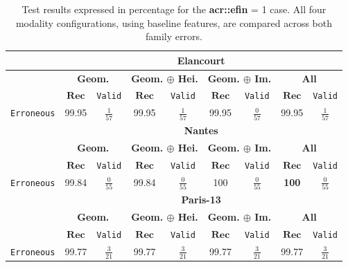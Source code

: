         \begin{table}
            \footnotesize
            \renewcommand{\arraystretch}{1.5}
            \begin{tabular}{|c | c c | c c | c c | c c |}
                \hline
                & \multicolumn{8}{c|}{\textbf{Elancourt}}\\
                \hline
                &\multicolumn{2}{c|}{\textbf{Geom.}} & \multicolumn{2}{c|}{\textbf{Geom. \(\oplus\) Hei.}} & \multicolumn{2}{c|}{\textbf{Geom. \(\oplus\) Im.}} & \multicolumn{2}{x{2.4cm}|}{\textbf{All}}\\
                \cline{2-9}
                & \(\bm{Rec}\) & \texttt{Valid} &  \(\bm{Rec}\) & \texttt{Valid} &  \(\bm{Rec}\) & \texttt{Valid} &  \(\bm{Rec}\) & \texttt{Valid} \\
                \hline
                \texttt{Erroneous} & 99.95 & $\frac{1}{57}$ & 99.95 & $\frac{1}{57}$ & 99.95 & $\frac{0}{57}$ & 99.95 & $\frac{1}{57}$ \\
                \hline
                \hline
                & \multicolumn{8}{c|}{\textbf{Nantes}}\\
                \hline
                &\multicolumn{2}{c|}{\textbf{Geom.}} & \multicolumn{2}{c|}{\textbf{Geom. \(\oplus\) Hei.}} & \multicolumn{2}{c|}{\textbf{Geom. \(\oplus\) Im.}} & \multicolumn{2}{x{2.4cm}|}{\textbf{All}}\\
                \cline{2-9}
                & \(\bm{Rec}\) & \texttt{Valid} &  \(\bm{Rec}\) & \texttt{Valid} &  \(\bm{Rec}\) & \texttt{Valid} &  \(\bm{Rec}\) & \texttt{Valid} \\
                \hline
                \texttt{Erroneous} & 99.84 & $\frac{0}{55}$ & 99.84 & $\frac{0}{55}$ & 100 & $\frac{0}{55}$ & \textbf{100} & $\frac{0}{55}$ \\
                \hline
                \hline
                & \multicolumn{8}{c|}{\textbf{Paris-13}}\\
                \hline
                &\multicolumn{2}{c|}{\textbf{Geom.}} & \multicolumn{2}{c|}{\textbf{Geom. \(\oplus\) Hei.}} & \multicolumn{2}{c|}{\textbf{Geom. \(\oplus\) Im.}} & \multicolumn{2}{x{2.4cm}|}{\textbf{All}}\\
                \cline{2-9}
                & \(\bm{Rec}\) & \texttt{Valid} &  \(\bm{Rec}\) & \texttt{Valid} &  \(\bm{Rec}\) & \texttt{Valid} &  \(\bm{Rec}\) & \texttt{Valid} \\
                \hline
                \texttt{Erroneous} & 99.77 & $\frac{3}{21}$ & 99.77 & $\frac{3}{21}$ & 99.77 & $\frac{3}{21}$ & 99.77 & $\frac{3}{21}$ \\
                \hline
            \end{tabular}
            \renewcommand{\arraystretch}{1}
            \caption[
                Test results expressed in percentage for the \textbf{\gls{acr::efin}} = 1 case.
            ]{
                \label{tab::ablation_f1}
                Test results expressed in percentage for the \textbf{\gls{acr::efin}} = 1 case.
                All four modality configurations, using baseline features, are compared across both family errors.
            }
        \end{table}
        
